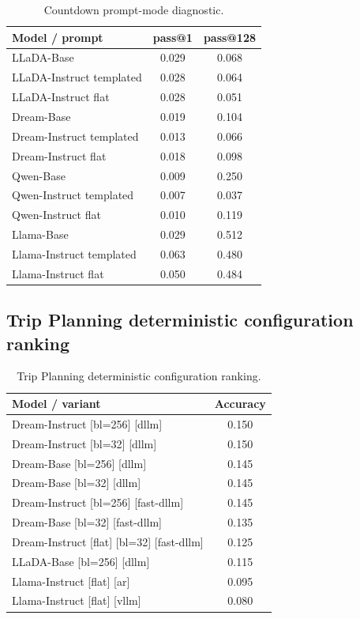 \begin{table}[H]
\centering
\caption{Countdown prompt-mode diagnostic.}
\label{tab:countdown-prompt-diagnostic}
\scriptsize
\begin{tabularx}{\textwidth}{Ycc}
\toprule
\textbf{Model / prompt} & \textbf{pass@1} & \textbf{pass@128} \\
\midrule
LLaDA-Base & 0.029 & 0.068 \\
LLaDA-Instruct templated & 0.028 & 0.064 \\
LLaDA-Instruct flat & 0.028 & 0.051 \\
Dream-Base & 0.019 & 0.104 \\
Dream-Instruct templated & 0.013 & 0.066 \\
Dream-Instruct flat & 0.018 & 0.098 \\
Qwen-Base & 0.009 & 0.250 \\
Qwen-Instruct templated & 0.007 & 0.037 \\
Qwen-Instruct flat & 0.010 & 0.119 \\
Llama-Base & 0.029 & 0.512 \\
Llama-Instruct templated & 0.063 & 0.480 \\
Llama-Instruct flat & 0.050 & 0.484 \\
\bottomrule
\end{tabularx}
\end{table}

\FloatBarrier
\subsection{Trip Planning deterministic configuration ranking}
\label{sec:appendix-trip-deterministic}

\begin{table}[H]
\centering
\caption{Trip Planning deterministic configuration ranking.}
\label{tab:trip-deterministic-full}
\scriptsize
\begin{tabularx}{\textwidth}{Yc}
\toprule
\textbf{Model / variant} & \textbf{Accuracy} \\
\midrule
Dream-Instruct [bl=256] [dllm] & 0.150 \\
Dream-Instruct [bl=32] [dllm] & 0.150 \\
Dream-Base [bl=256] [dllm] & 0.145 \\
Dream-Base [bl=32] [dllm] & 0.145 \\
Dream-Instruct [bl=256] [fast-dllm] & 0.145 \\
Dream-Base [bl=32] [fast-dllm] & 0.135 \\
Dream-Instruct [flat] [bl=32] [fast-dllm] & 0.125 \\
LLaDA-Base [bl=256] [dllm] & 0.115 \\
Llama-Instruct [flat] [ar] & 0.095 \\
Llama-Instruct [flat] [vllm] & 0.080 \\
\bottomrule
\end{tabularx}
\end{table}

